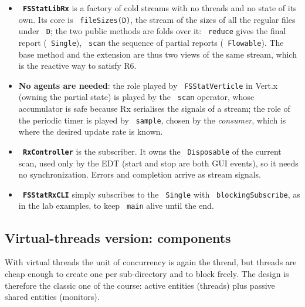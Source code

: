 \documentclass[11pt,a4paper]{article}
\newcommand{\code}[1]{\texttt{\hyphenchar\font=-1 #1}}
\begin{document}
\begin{itemize}
  \item \textbf{\code{FSStatLibRx}} is a factory of cold streams with no threads and no state of its
        own. Its core is \code{fileSizes(D)}, the stream of the sizes of all the regular files under
        \code{D}; the two public methods are folds over it: \code{reduce} gives the final report
        (\code{Single}), \code{scan} the sequence of partial reports (\code{Flowable}). The base
        method and the extension are thus two views of the same stream, which is the reactive way to
        satisfy R6.
  \item \textbf{No agents are needed}: the role played by \code{FSStatVerticle} in Vert.x (owning the
        partial state) is played by the \code{scan} operator, whose accumulator is safe because Rx
        serialises the signals of a stream; the role of the periodic timer is played by \code{sample},
        chosen by the \emph{consumer}, which is where the desired update rate is known.
  \item \textbf{\code{RxController}} is the subscriber. It owns the \code{Disposable} of the current
        scan, used only by the EDT (start and stop are both GUI events), so it needs no
        synchronization. Errors and completion arrive as stream signals.
  \item \textbf{\code{FSStatRxCLI}} simply subscribes to the \code{Single} with
        \code{blockingSubscribe}, as in the lab examples, to keep \code{main} alive until the end.
\end{itemize}

\subsection{Virtual-threads version: components}

With virtual threads the unit of concurrency is again the thread, but threads are cheap enough to
create one per sub-directory and to block freely. The design is therefore the classic one of the
course: active entities (threads) plus passive shared entities (monitors).
\end{document}
